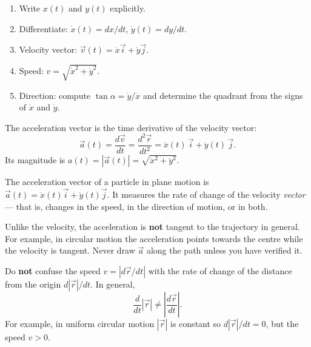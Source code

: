\documentclass[11pt]{article}
\newcommand{\cle}[1]{{\popxbold\color{popdark}#1}}
\newcounter{popsec}
\newcounter{popsub}
\newcommand{\courssub}[1]{%
  \stepcounter{popsub}%
  \par\vspace{9pt}\noindent{\popxbold\fontsize{11.5}{13}\selectfont\color{popink}{\color{poporange}\thepopsec.\thepopsub}\hspace{6pt}#1}\par\nopagebreak\vspace{4pt}
}
\begin{document}
\begin{methode}
\begin{enumerate}
\item Write $x(t)$ and $y(t)$ explicitly.
\item Differentiate: $\dot{x}(t) = dx/dt$, $\dot{y}(t) = dy/dt$.
\item Velocity vector: $\vec{v}(t) = \dot{x}\vec{i} + \dot{y}\vec{j}$.
\item Speed: $v = \sqrt{\dot{x}^2 + \dot{y}^2}$.
\item Direction: compute $\tan\alpha = \dot{y}/\dot{x}$ and determine the quadrant from the signs of $\dot{x}$ and $\dot{y}$.
\end{enumerate}
\end{methode}

\courssub{Acceleration vector}

The \cle{acceleration vector} is the time derivative of the velocity vector:
\[
\vec{a}(t) = \frac{d\vec{v}}{dt} = \frac{d^2\vec{r}}{dt^2} = \ddot{x}(t)\,\vec{i} + \ddot{y}(t)\,\vec{j}.
\]
Its magnitude is $a(t) = |\vec{a}(t)| = \sqrt{\ddot{x}^2 + \ddot{y}^2}$.

\begin{definition}
The acceleration vector of a particle in plane motion is $\vec{a}(t) = \ddot{x}(t)\vec{i} + \ddot{y}(t)\vec{j}$. It measures the rate of change of the velocity \emph{vector} — that is, changes in the speed, in the direction of motion, or in both.
\end{definition}

\begin{attention}
Unlike the velocity, the acceleration is \textbf{not} tangent to the trajectory in general. For example, in circular motion the acceleration points towards the centre while the velocity is tangent. Never draw $\vec{a}$ along the path unless you have verified it.
\end{attention}

\begin{attention}
Do \textbf{not} confuse the speed $v = |d\vec{r}/dt|$ with the rate of change of the distance from the origin $d|\vec{r}|/dt$. In general,
\[
\frac{d}{dt}|\vec{r}| \neq \left|\frac{d\vec{r}}{dt}\right|.
\]
For example, in uniform circular motion $|\vec{r}|$ is constant so $d|\vec{r}|/dt = 0$, but the speed $v > 0$.
\end{attention}
\end{document}
